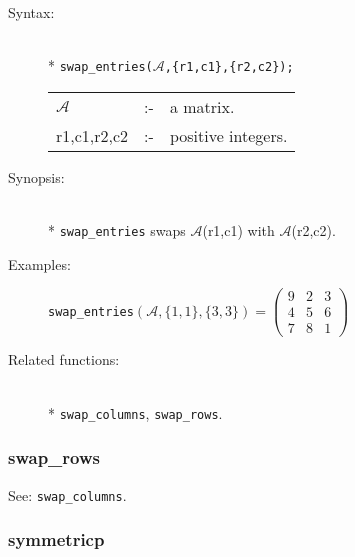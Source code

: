 \begin{description}
\item[Syntax:]\mbox{}\\*
\texttt{swap\_entries($\mathcal{A}$,\{r1,c1\},\{r2,c2\});}\\[2mm]
\begin{tabular}{l l l}
$\mathcal{A}$  &:-& a matrix. \\
r1,c1,r2,c2 &:-& positive integers.
\end{tabular}

\item[Synopsis:]\mbox{}\\*
\texttt{swap\_entries} swaps $\mathcal{A}$(r1,c1) with
                $\mathcal{A}$(r2,c2).

\item[Examples:]
\begin{flushleft}
\texttt{swap\_entries}\((\mathcal{A},\{1,1\},\{3,3\}) =
        \begin{pmatrix} 9 & 2 & 3 \\ 4 & 5 & 6 \\ 7 & 8 & 1 \end{pmatrix}\)
\end{flushleft}

\item[Related functions:]\mbox{}\\*
\texttt{swap\_columns}, \texttt{swap\_rows}.
\end{description}


\subsubsection{swap\_rows}
\label{linalg:swap_rows}
See: \texttt{swap\_columns}.


\subsubsection{symmetricp}
\label{linalg:symmetricp}

